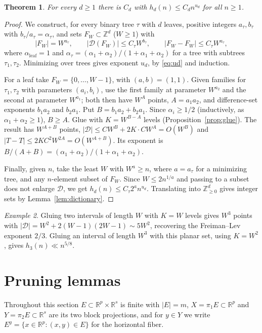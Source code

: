\documentclass[11pt]{amsart}
\newtheorem{theorem}{Theorem}[section]
\theoremstyle{definition}
\theoremstyle{remark}
\newtheorem{example}[theorem]{Example}
\newcommand{\R}{\mathbb{R}}
\newcommand{\Z}{\mathbb{Z}}
\newcommand{\Dp}{\mathcal{D}}
\begin{document}
\begin{theorem}\label{thm:upper}
For every $d\ge1$ there is $C_d$ with $h_d(n)\le C_dn^{u_d}$ for all $n\ge1$.
\end{theorem}

\begin{proof}
We construct, for every binary tree $\tau$ with $d$ leaves, positive integers $a_\tau,b_\tau$ with $b_\tau/a_\tau=\alpha_\tau$, and sets $F_W\subset\Z^d$ ($W\ge1$) with
\[
|F_W|=W^{a_\tau},\qquad |\Dp(F_W)|\le C_\tau W^{b_\tau},\qquad |F_W-F_W|\le C_\tau W^{a_\tau},
\]
where $\alpha_{\text{leaf}}=1$ and $\alpha_\tau=(\alpha_1+\alpha_2)/(1+\alpha_1+\alpha_2)$ for a tree with subtrees $\tau_1,\tau_2$. Minimizing over trees gives exponent $u_d$, by \eqref{eq:ud} and induction.

For a leaf take $F_W=\{0,\dots,W-1\}$, with $(a,b)=(1,1)$. Given families for $\tau_1,\tau_2$ with parameters $(a_i,b_i)$, use the first family at parameter $W^{a_2}$ and the second at parameter $W^{a_1}$; both then have $W^{A}$ points, $A=a_1a_2$, and difference-set exponents $b_1a_2$ and $b_2a_1$. Put $B=b_1a_2+b_2a_1$. Since $\alpha_i\ge1/2$ (inductively, as $\alpha_1+\alpha_2\ge1$), $B\ge A$. Glue with $K=W^{B-A}$ levels (Proposition~\ref{prop:glue}). The result has $W^{A+B}$ points, $|\Dp|\le C W^{B}+2K\cdot CW^{A}=O(W^B)$ and $|T-T|\le 2K C^2W^{2A}=O(W^{A+B})$. Its exponent is $B/(A+B)=(\alpha_1+\alpha_2)/(1+\alpha_1+\alpha_2)$.

Finally, given $n$, take the least $W$ with $W^{a}\ge n$, where $a=a_\tau$ for a minimizing tree, and any $n$-element subset of $F_W$. Since $W\le 2n^{1/a}$ and passing to a subset does not enlarge $\Dp$, we get $h_d(n)\le C_\tau 2^{a} n^{u_d}$. Translating into $\Z_{\ge0}^d$ gives integer sets by Lemma~\ref{lem:dictionary}.
\end{proof}

\begin{example}
Gluing two intervals of length $W$ with $K=W$ levels gives $W^3$ points with $|\Dp|=W^2+2(W-1)(2W-1)\sim5W^2$, recovering the Freiman--Lev exponent $2/3$. Gluing an interval of length $W^3$ with this planar set, using $K=W^2$, gives $h_3(n)\ll n^{5/8}$.
\end{example}

\section{Pruning lemmas}\label{sec:pruning}

Throughout this section $E\subset\R^p\times\R^s$ is finite with $|E|=m$, $X=\pi_1E\subset\R^p$ and $Y=\pi_2E\subset\R^s$ are its two block projections, and for $y\in Y$ we write $E^y=\{x\in\R^p:(x,y)\in E\}$ for the horizontal fiber.
\end{document}
